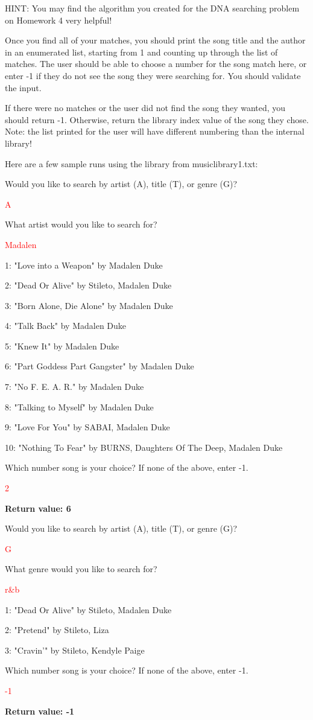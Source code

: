 HINT: You may find the algorithm you created for the DNA searching problem on Homework 4 very helpful!

Once you find all of your matches, you should print the song title and the author in an enumerated list, starting from 1 and counting up through the list of matches. The user should be able to choose a number for the song match here, or enter -1 if they do not see the song they were searching for. You should validate the input.

If there were no matches or the user did not find the song they wanted, you should return -1. Otherwise, return the library index value of the song they chose. Note: the list printed for the user will have different numbering than the internal library!

Here are a few sample runs using the library from musiclibrary1.txt:
\begin{sample}
Would you like to search by artist (A), title (T), or genre (G)?

\textcolor{red}{A}

What artist would you like to search for?

\textcolor{red}{Madalen}

1: "Love into a Weapon" by Madalen Duke

2: "Dead Or Alive" by Stileto, Madalen Duke

3: "Born Alone, Die Alone" by Madalen Duke

4: "Talk Back" by Madalen Duke

5: "Knew It" by Madalen Duke

6: "Part Goddess Part Gangster" by Madalen Duke

7: "No F. E. A. R." by Madalen Duke

8: "Talking to Myself" by Madalen Duke

9: "Love For You" by SABAI, Madalen Duke

10: "Nothing To Fear" by BURNS, Daughters Of The Deep, Madalen Duke

Which number song is your choice? If none of the above, enter -1. 

\textcolor{red}{2}

\textbf{Return value: 6}
\end{sample}

\begin{sample}
Would you like to search by artist (A), title (T), or genre (G)?

\textcolor{red}{G}

What genre would you like to search for?

\textcolor{red}{r\&b}

1: "Dead Or Alive" by Stileto, Madalen Duke

2: "Pretend" by Stileto, Liza

3: "Cravin'" by Stileto, Kendyle Paige

Which number song is your choice? If none of the above, enter -1.

\textcolor{red}{-1}

\textbf{Return value: -1}
\end{sample}

